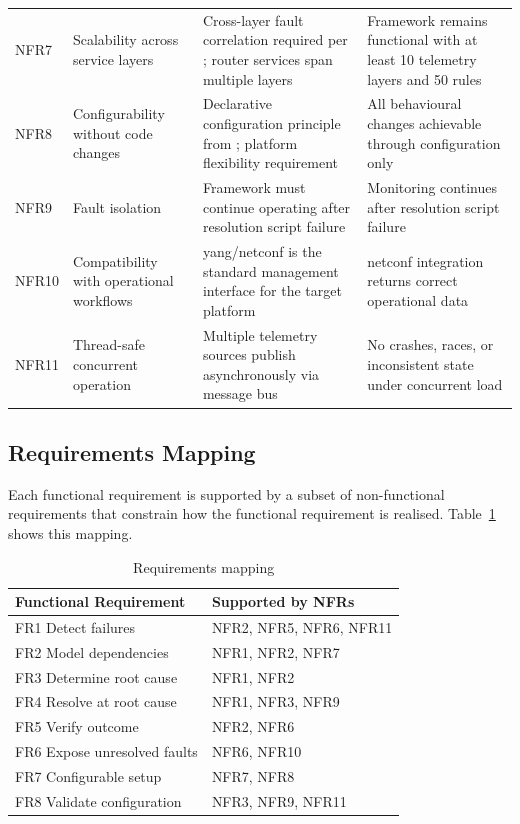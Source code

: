 \begin{table}[htbp]
\begin{tabular}{p{1.2cm} p{3.7cm} p{5.0cm} p{4.8cm}}
NFR7 & Scalability across service layers & Cross-layer fault correlation required per \cite{ref12,ref13}; router services span multiple layers & Framework remains functional with at least 10 telemetry layers and 50 rules \\
NFR8 & Configurability without code changes & Declarative configuration principle from \cite{ref29}; platform flexibility requirement & All behavioural changes achievable through configuration only \\
NFR9 & Fault isolation & Framework must continue operating after resolution script failure & Monitoring continues after resolution script failure \\
NFR10 & Compatibility with operational workflows & \gls{yang}/\gls{netconf} is the standard management interface for the target platform & \gls{netconf} integration returns correct operational data \\
NFR11 & Thread-safe concurrent operation & Multiple telemetry sources publish asynchronously via message bus & No crashes, races, or inconsistent state under concurrent load \\
\bottomrule
\end{tabular}
\end{table}

\subsection{Requirements Mapping}\label{sec:requirements-mapping}

Each functional requirement is supported by a subset of non-functional requirements that constrain how the functional requirement is realised. Table~\ref{tab:requirements-mapping} shows this mapping.

\begin{table}[htbp]
\centering
\caption{Requirements mapping}
\label{tab:requirements-mapping}
\begin{tabular}{p{6.5cm} p{7.5cm}}
\toprule
Functional Requirement & Supported by NFRs \\
\midrule
FR1 Detect failures & NFR2, NFR5, NFR6, NFR11 \\
FR2 Model dependencies & NFR1, NFR2, NFR7 \\
FR3 Determine root cause & NFR1, NFR2 \\
FR4 Resolve at root cause & NFR1, NFR3, NFR9 \\
FR5 Verify outcome & NFR2, NFR6 \\
FR6 Expose unresolved faults & NFR6, NFR10 \\
FR7 Configurable setup & NFR7, NFR8 \\
FR8 Validate configuration & NFR3, NFR9, NFR11 \\
\bottomrule
\end{tabular}
\end{table}

